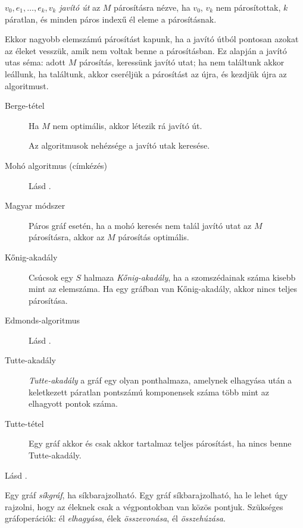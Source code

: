 \documentclass[DIV=15,appendixprefix]{scrreprt}
\theoremstyle{definition}
\theoremstyle{remark}
\begin{document}
$ v_0,{} e_1,{} \ldots,{} e_k,{} v_k $ \emph{javító út} az $ M $ párosításra nézve, ha $ v_0 $,
$ v_k $ nem párosítottak, $k$ páratlan, és minden páros indexű él eleme a párosításnak.

Ekkor nagyobb elemszámú párosítást kapunk, ha a javító útból pontosan azokat az éleket vesszük, amik
nem voltak benne a párosításban. Ez alapján a javító utas séma: adott $ M $ párosítás, keressünk
javító utat; ha nem találtunk akkor leállunk, ha találtunk, akkor cseréljük a párosítást az újra,
és kezdjük újra az algoritmust.
\begin{description}
	\item[Berge-tétel] Ha $ M $ nem optimális, akkor létezik rá javító út.

		Az algoritmusok nehézsége a javító utak keresése.
	\item[Mohó algoritmus (címkézés)] Lásd
		\cite[\href{http://www.math.u-szeged.hu/~hajnal/courses/MSc_Diszkret/MSc_kombi13/ea-Edmonds%
		.pdf}{\emph{Párosítások II. -- Kombinatorikus módszerek}}, 2.~szakasz]{DiMat}.
	\item[Magyar módszer] Páros gráf esetén, ha a mohó keresés nem talál javító utat az $M$
		párosításra, akkor az $M$ párosítás optimális.
	\item[Kőnig-akadály] Csúcsok egy $S$ halmaza \emph{Kőnig-akadály}, ha a szomszédainak száma
		kisebb mint az elemszáma. Ha egy gráfban van Kőnig-akadály, akkor nincs teljes párosítása.
	\item[Edmonds-algoritmus] Lásd
		\cite[\href{http://www.math.u-szeged.hu/~hajnal/courses/MSc_Diszkret/MSc_kombi13/ea-Edmonds%
		.pdf}{\emph{Párosítások II. -- Kombinatorikus módszerek}}, 3.~szakasz]{DiMat}.
	\item[Tutte-akadály] \emph{Tutte-akadály} a gráf egy olyan ponthalmaza, amelynek elhagyása után
		a keletkezett páratlan pontszámú komponensek száma több mint az elhagyott pontok száma.
	\item[Tutte-tétel]  Egy gráf akkor és csak akkor tartalmaz teljes párosítást, ha nincs benne
		Tutte-akadály.
\end{description}
%
Lásd
\cite[\href{http://www.math.u-szeged.hu/~hajnal/courses/MSc_Diszkret/MSc_kombi13/ea-Wagner.pdf}
{\emph{Síkgráfok I. -- Wagner-tétel}}]{DiMat}.

Egy gráf \emph{síkgráf}, ha síkbarajzolható. Egy gráf síkbarajzolható, ha le lehet úgy rajzolni,
hogy az éleknek csak a végpontokban van közös pontjuk. Szükséges gráfoperációk: él \emph{elhagyása},
élek \emph{összevonása}, él \emph{összehúzása}.
\end{document}
